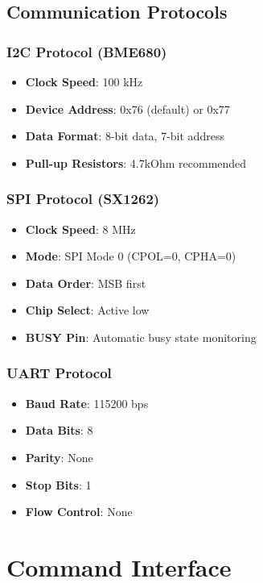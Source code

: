 \documentclass[11pt,a4paper]{article}
\begin{document}
\subsection{Communication Protocols}

\subsubsection{I2C Protocol (BME680)}
\begin{itemize}
    \item \textbf{Clock Speed}: 100 kHz
    \item \textbf{Device Address}: 0x76 (default) or 0x77
    \item \textbf{Data Format}: 8-bit data, 7-bit address
    \item \textbf{Pull-up Resistors}: 4.7kOhm recommended
\end{itemize}

\subsubsection{SPI Protocol (SX1262)}
\begin{itemize}
    \item \textbf{Clock Speed}: 8 MHz
    \item \textbf{Mode}: SPI Mode 0 (CPOL=0, CPHA=0)
    \item \textbf{Data Order}: MSB first
    \item \textbf{Chip Select}: Active low
    \item \textbf{BUSY Pin}: Automatic busy state monitoring
\end{itemize}

\subsubsection{UART Protocol}
\begin{itemize}
    \item \textbf{Baud Rate}: 115200 bps
    \item \textbf{Data Bits}: 8
    \item \textbf{Parity}: None
    \item \textbf{Stop Bits}: 1
    \item \textbf{Flow Control}: None
\end{itemize}

\section{Command Interface}
\end{document}
